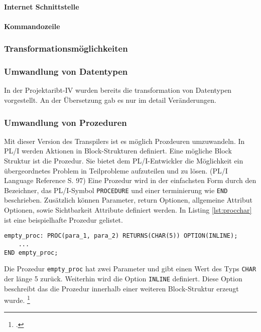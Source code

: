 {\paragraph{Internet Schnittstelle}
\paragraph{Kommandozeile}

\subsubsection{Transformationsmöglichkeiten}
\subsubsection{Umwandlung von Datentypen}
In der Projektaribt-IV wurden bereits die transformation von Datentypen vorgestellt. An der Übersetzung gab es nur im detail Veränderungen.

\subsubsection{Umwandlung von Prozeduren}

Mit dieser Version des Transpilers ist es möglich Prozdeuren umzuwandeln.
In PL/I werden Aktionen in Block-Strukturen definiert. Eine mögliche Block Struktur ist die Prozedur. Sie bietet dem PL/I-Entwickler die Möglichkeit ein übergeordnetes Problem
in Teilprobleme aufzuteilen und zu lösen. (PL/I Language Reference S. 97)
Eine Prozedur wird in der einfachsten Form durch den Bezeichner, das PL/I-Symbol \verb+PROCEDURE+ und einer terminierung wie \verb+END+
beschrieben.
Zusätzlich können Parameter, return Optionen, allgemeine Attribut Optionen, sowie Sichtbarkeit Attribute definiert werden.
In Listing \ref{lst:procchar} ist eine beispielhafte Prozedur gelistet.

\begin{lstlisting}[language=PL/I, caption=Deklaration einer Prozedur des Typs Char, label={lst:procchar}]
empty_proc: PROC(para_1, para_2) RETURNS(CHAR(5)) OPTION(INLINE);
	...
END empty_proc;
\end{lstlisting}

Die Prozedur \verb+empty_proc+ hat zwei Parameter und gibt einen Wert des Typs \verb+CHAR+ der länge 5 zurück.
Weiterhin wird die Option \verb+INLINE+ definiert. Diese Option beschreibt das die Prozedur innerhalb einer weiteren Block-Struktur erzeugt wurde. \footcite[Vgl. ][]{optionsstmt}

}
